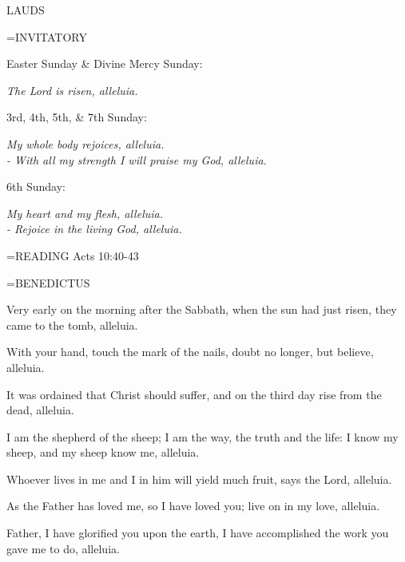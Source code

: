 \begin{flushleft}\normalsize LAUDS\\\end{flushleft}
\hangindent=\parindent \small{INVITATORY}
\begin{center}
\end{center}Easter Sunday \& Divine Mercy Sunday:\begin{center}\textit{		The Lord is risen, alleluia.\\}
\end{center}3rd, 4th, 5th, \& 7th Sunday:\begin{center}\textit{	My whole body rejoices, alleluia.	\\}
\textit{					- With all my strength I will praise my God, alleluia.\\}
\end{center}6th Sunday:\begin{center}\textit{		My heart and my flesh, alleluia.\\}
\textit{			- Rejoice in the living God, alleluia.\\}
\end{center}

\hangindent=\parindent \small{READING}    Acts 10:40-43 \textbf{   \\}

\hangindent=\parindent \small BENEDICTUS
\begin{description}[labelindent=\parindent, noitemsep, leftmargin=*]
\item [Easter Sunday:] 	Very early on the morning after the Sabbath, when the sun had just risen, they came to the tomb, alleluia.
\item [Divine Mercy Sunday:] 	With your hand, touch the mark of the nails, doubt no longer, but believe, alleluia.
\item [3rd Sunday:] 		It was ordained that Christ should suffer, and on the third day rise from the dead, alleluia.
\item [4th Sunday:] 		I am the shepherd of the sheep; I am the way, the truth and the life: I know my sheep, and my sheep know me, alleluia.
\item [5th Sunday:] 		Whoever lives in me and I in him will yield much fruit, says the Lord, alleluia.
\item [6th Sunday:] 		As the Father has loved me, so I have loved you; live on in my love, alleluia.
\item [7th Sunday:] 		Father, I have glorified you upon the earth, I have accomplished the work you gave me to do, alleluia.
\end{description}


